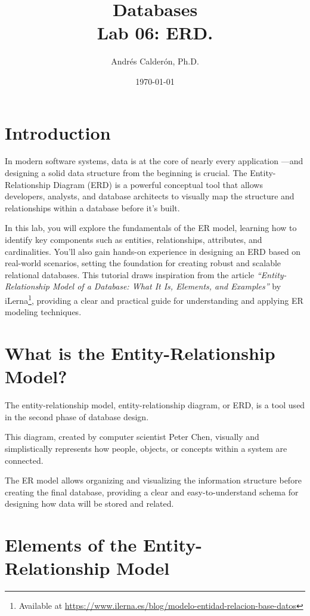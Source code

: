 \documentclass{article}
\title{Databases \\ Lab 06: ERD.}
\author{Andrés Calderón, Ph.D.}
\date{\today}
\begin{document}
\maketitle

\section{Introduction}

In modern software systems, data is at the core of nearly every application —and designing a solid data structure from the beginning is crucial. The Entity-Relationship Diagram (ERD) is a powerful conceptual tool that allows developers, analysts, and database architects to visually map the structure and relationships within a database before it's built.

In this lab, you will explore the fundamentals of the ER model, learning how to identify key components such as entities, relationships, attributes, and cardinalities. You'll also gain hands-on experience in designing an ERD based on real-world scenarios, setting the foundation for creating robust and scalable relational databases. This tutorial draws inspiration from the article \textit{``Entity-Relationship Model of a Database: What It Is, Elements, and Examples''} by iLerna\footnote{Available at \url{https://www.ilerna.es/blog/modelo-entidad-relacion-base-datos}}, providing a clear and practical guide for understanding and applying ER modeling techniques.

\section{What is the Entity-Relationship Model?}

The entity-relationship model, entity-relationship diagram, or ERD, is a tool used in the second phase of database design.

This diagram, created by computer scientist Peter Chen, visually and simplistically represents how people, objects, or concepts within a system are connected.

The ER model allows organizing and visualizing the information structure before creating the final database, providing a clear and easy-to-understand schema for designing how data will be stored and related.

\section{Elements of the Entity-Relationship Model}
\end{document}
